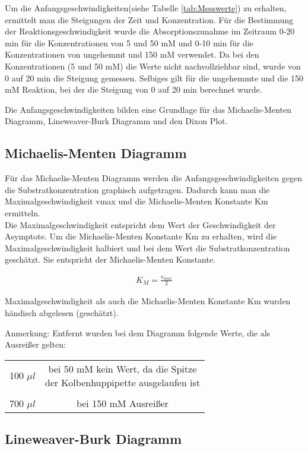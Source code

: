 Um die Anfangsgeschwindigkeiten(siehe Tabelle \ref{tab:Messwerte}) zu erhalten, ermittelt man die Steigungen der Zeit und Konzentration.  Für die Bestimmung der Reaktionsgeschwindigkeit wurde die Absorptionszunahme im Zeitraum 0-20 min für die Konzentrationen von 5 und 50 mM und 0-10 min für die Konzentrationen von ungehemmt und 150 mM verwendet. Da bei den Konzentrationen (5 und 50 mM) die Werte nicht nachvollziehbar sind, wurde von 0 auf 20 min die Steigung gemessen. Selbiges gilt für die ungehemmte und die 150 mM Reaktion, bei der die Steigung von 0 auf 20 min berechnet  wurde.



Die Anfangsgeschwindigkeiten bilden eine Grundlage für das Michaelis-Menten Diagramm, Lineweaver-Burk Diagramm und den Dixon Plot. 


\subsection{Michaelis-Menten Diagramm}

Für das Michaelis-Menten Diagramm werden die Anfangsgeschwindigkeiten gegen die Substratkonzentration graphisch aufgetragen. Dadurch kann man die Maximalgeschwindigkeit vmax und die Michaelis-Menten Konstante Km ermitteln.
\\
Die Maximalgeschwindigkeit entspricht dem Wert der Geschwindigkeit der Asymptote. 
Um die Michaelis-Menten Konstante Km zu erhalten, wird die Maximalgeschwindigkeit halbiert und bei dem Wert die Substratkonzentration geschätzt. Sie entspricht der Michaelis-Menten Konstante. 

\begin{align}
  K_M = \frac{v_{max}}{2}
\end{align}

Maximalgeschwindigkeit als auch die Michaelis-Menten Konstante Km wurden händisch abgelesen (geschätzt).


Anmerkung: Entfernt wurden bei dem Diagramm folgende Werte, die als Ausreißer gelten: \\
\begin{center}
  \begin{tabular}{cc}
    100 $\mu l$ & \makecell{bei 50 mM kein Wert, da die Spitze \\ der Kolbenhuppipette ausgelaufen ist} \\
    & \\
    700 $\mu l$ & bei 150 mM Ausreißer
  \end{tabular}
  \subsection{Lineweaver-Burk Diagramm}
\end{center}


